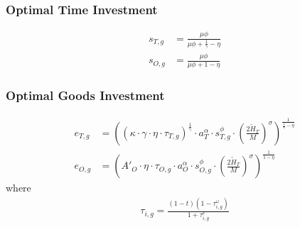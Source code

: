 \documentclass[11pt]{beamer}
\begin{document}
\begin{frame}
	\frametitle{Optimal Time Investment} 
	\label{timeinv}
	\begin{align}
		s_{T,g} & = \frac{\mu \phi}{\mu \phi+\tfrac{1}{\gamma}-\eta} \nonumber\\
		s_{O,g} & = \frac{\mu \phi}{\mu \phi+1-\eta} \nonumber
	\end{align}
	\hyperlink{eqm}{}
\end{frame}

\begin{frame}
	\frametitle{Optimal Goods Investment} 
	\label{goodinv}
	\begin{align}
		e_{T,g} & = \left( \left(\kappa \cdot \gamma \cdot \eta \cdot \tau_{T,g} \right)^\frac{1}{\gamma} \cdot a_T^{\alpha} \cdot s_{T,g}^{\phi} \cdot \left(\tfrac{2\widetilde{H}_T}{M}\right)^{\sigma}\right)^{\frac{1}{\frac{1}{\gamma}-\eta}}  \nonumber\\
		e_{O,g} & = \left( {{A'}_{O}} \cdot \eta \cdot\tau_{O,g} \cdot a_O^\alpha \cdot s_{O,g}^\phi \cdot  \left(\tfrac{2\widetilde{H}_T}{M}\right)^\sigma \right)^{\frac{1}{1-\eta}} \nonumber
	\end{align}
	where
	\begin{align}
		\tau_{i,g} =\frac{(1-t)(1-\tau^{\omega}_{i,g})}{1+\tau^e_{i,g}} \nonumber
	\end{align}
	\hyperlink{eqm}{}
\end{frame}
\end{document}
